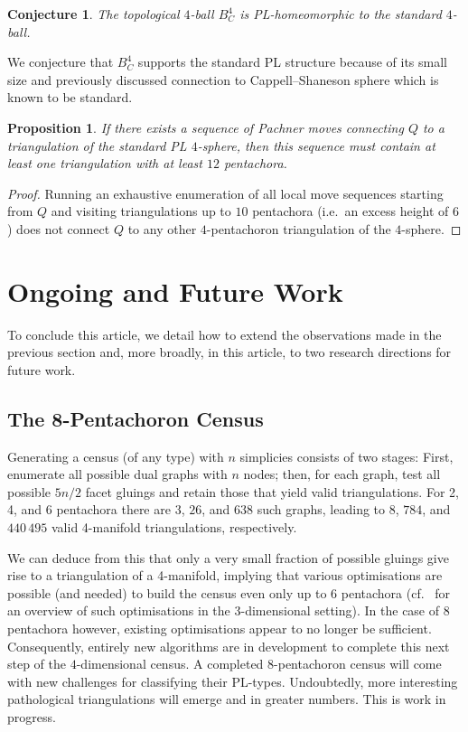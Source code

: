 \documentclass[pdflatex,sn-mathphys-num]{sn-jnl}
\theoremstyle{thmstyleone}%
\newtheorem{proposition}[theorem]{Proposition}%
\theoremstyle{thmstyletwo}%
\newtheorem{conjecture}{Conjecture}%
\theoremstyle{thmstylethree}%
\theoremstyle{remark}
\begin{document}
\begin{conjecture}
The topological $4$-ball $B^4_C$ is PL-homeomorphic to the standard $4$-ball.
\end{conjecture}

We conjecture that $B^4_C$ supports the standard PL structure because of its small size and previously discussed connection to Cappell--Shaneson sphere which is known to be standard.

\begin{proposition}
    If there exists a sequence of Pachner moves connecting $Q$ to a triangulation of the standard PL $4$-sphere, then this sequence must contain at least one triangulation with at least $12$ pentachora.
\end{proposition}

\begin{proof}
  Running an exhaustive enumeration of all local move sequences starting from $Q$ and visiting triangulations up to $10$ pentachora (i.e.\ an excess height of $6$) does not connect $Q$ to any other $4$-pentachoron triangulation of the $4$-sphere.
\end{proof}

\section{Ongoing and Future Work}
To conclude this article, we detail how to extend the observations made in the previous section and, more broadly, in this article, to two research directions for future work.
    
\subsection{The 8-Pentachoron Census}\label{sec:future-eightP}
Generating a census (of any type) with $n$ simplicies consists of two stages: First, enumerate all possible dual graphs with $n$ nodes; then, for each graph, test all possible $5n/2$ facet gluings and retain those that yield valid triangulations.
For 2, 4, and 6 pentachora there are $3$, $26$, and $638$ such graphs, 
leading to $8$, $784$, and $440\,495$ valid 4-manifold triangulations, respectively.

We can deduce from this that only a very small fraction of possible gluings give rise to a triangulation of a 4-manifold, implying that various optimisations are possible (and needed) to build the census even only up to $6$ pentachora (cf.\ \cite{burton-efficientEnumeration,burtonNonOrientableCensusUnionFind,burtonPettersson-enumerating3} for an overview of such optimisations in the $3$-dimensional setting). In the case of 8 pentachora however, existing optimisations appear to no longer be sufficient. Consequently, entirely new algorithms are in development to complete this next step of the $4$-dimensional census. A completed $8$-pentachoron census will come with new challenges for classifying their PL-types. Undoubtedly, more interesting pathological triangulations will emerge and in greater numbers. This is work in progress.
\end{document}
